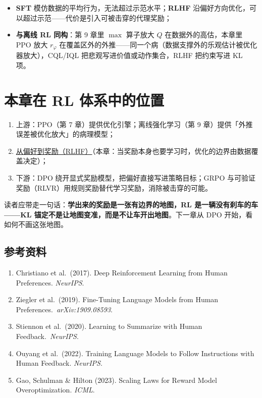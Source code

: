 \documentclass{article}
\begin{document}
\begin{itemize}
  \item \textbf{SFT} 模仿数据的平均行为，无法超过示范水平；\textbf{RLHF} 沿偏好方向优化，可以超过示范——代价是引入可被击穿的代理奖励；
  \item \textbf{与离线 RL 同构}：第 9 章里 $\max$ 算子放大 $Q$ 在数据外的高估，本章里 PPO 放大 $r_{\varphi}$ 在覆盖区外的外推——同一个病（数据支撑外的乐观估计被优化器放大），CQL/IQL 把悲观写进价值或动作集合，RLHF 把约束写进 KL 项。
\end{itemize}

\section*{本章在 RL 体系中的位置}

\begin{enumerate}
  \item 上游：PPO（第 7 章）提供优化引擎；离线强化学习（第 9 章）提供「外推误差被优化放大」的病理模型；
  \item \underline{从偏好到奖励（RLHF）}（本章：当奖励本身也要学习时，优化的边界由数据覆盖决定）；
  \item 下游：DPO 绕开显式奖励模型，把偏好直接写进策略目标；GRPO 与可验证奖励（RLVR）用规则奖励替代学习奖励，消除被击穿的可能。
\end{enumerate}

读者应带走一句话：\textbf{学出来的奖励是一张有边界的地图，RL 是一辆没有刹车的车——KL 锚定不是让地图变准，而是不让车开出地图}。下一章从 DPO 开始，看如何不画这张地图。

\subsection*{参考资料}

\small
\begin{enumerate}
  \item Christiano et al.\ (2017). Deep Reinforcement Learning from Human Preferences. \textit{NeurIPS}.
  \item Ziegler et al.\ (2019). Fine-Tuning Language Models from Human Preferences.\allowbreak\ \textit{arXiv:1909.08593}.
  \item Stiennon et al.\ (2020). Learning to Summarize with Human Feedback.\allowbreak\ \textit{NeurIPS}.
  \item Ouyang et al.\ (2022). Training Language Models to Follow Instructions with Human Feedback. \textit{NeurIPS}.
  \item Gao, Schulman \& Hilton (2023). Scaling Laws for Reward Model Overoptimization. \textit{ICML}.
\end{enumerate}
\end{document}
